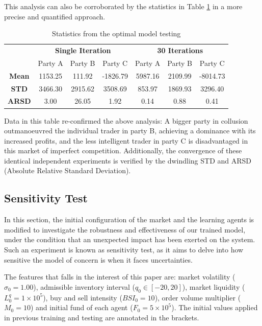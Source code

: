 \documentclass[11pt,twoside]{article}
\numberwithin{Theorem}{section}
\numberwithin{Definition}{section}
\numberwithin{Lemma}{section}
\numberwithin{Algorithm}{section}
\numberwithin{equation}{section}
\begin{document}
This analysis can also be corroborated by the statistics in Table \ref{tb:op-stats} in a more precise and quantified approach.

\begin{table}[!ht]
\centering
\caption{Statistics from the optimal model testing}
\label{tb:op-stats}
\begin{tabular}{|c|ccc|ccc|}
\hline
\cellcolor[HTML]{ECF4FF} & \multicolumn{3}{c|}{\textbf{Single Iteration}} & \multicolumn{3}{c|}{\textbf{30 Iterations}} \\ \cline{2-7} 
\cellcolor[HTML]{ECF4FF} & Party A       & Party B       & Party C        & Party A      & Party B      & Party C       \\ \hline
\textbf{Mean}            & 1153.25       & 111.92        & -1826.79       & 5987.16      & 2109.99      & -8014.73      \\
\textbf{STD}             & 3466.30       & 2915.62       & 3508.69        & 853.97       & 1869.93      & 3296.40       \\
\textbf{ARSD}            & 3.00          & 26.05         & 1.92           & 0.14         & 0.88         & 0.41          \\ \hline
\end{tabular}
\end{table}

Data in this table re-confirmed the above analysis: A bigger party in collusion outmanoeuvred the individual trader in party B, achieving a dominance with its increased profits, and the less intelligent trader in party C is disadvantaged in this market of imperfect competition. Additionally, the convergence of these identical independent experiments is verified by the dwindling STD and ARSD (Absolute Relative Standard Deviation).
\clearpage

\subsection{Sensitivity Test}
In this section, the initial configuration of the market and the learning agents is modified to investigate the robustness and effectiveness of our trained model, under the condition that an unexpected impact has been exerted on the system. Such an experiment is known as sensitivity test, as it aims to delve into how sensitive the model of concern is when it faces uncertainties.

The features that falls in the interest of this paper are: market volatility ($\sigma_0=1.00$), admissible inventory interval ($q_0\in[-20,20]$), market liquidity ($L^q_0=1\times 10^5$), buy and sell intensity ($BSI_0=10$), order volume multiplier ($M_0=10$) and initial fund of each agent ($F_0=5\times 10^5$). The initial values applied in previous training and testing are annotated in the brackets.
\end{document}
